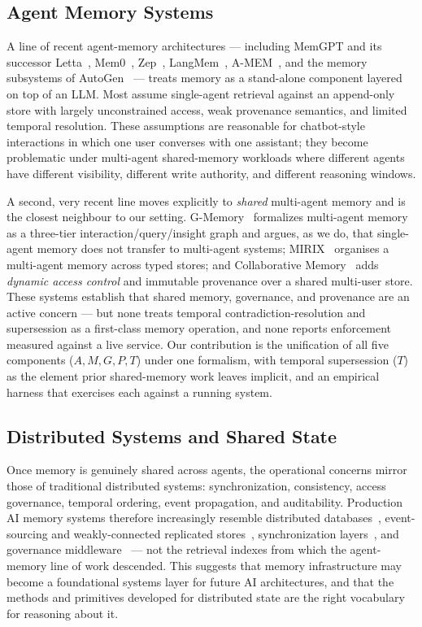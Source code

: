 \documentclass[10pt,twocolumn,letterpaper]{article}
\begin{document}
\subsection{Agent Memory Systems}

A line of recent agent-memory architectures --- including MemGPT and its successor Letta~\citep{memgpt2023}, Mem0~\citep{mem0}, Zep~\citep{zep}, LangMem~\citep{langmem}, A-MEM~\citep{amem2025}, and the memory subsystems of AutoGen~\citep{autogen} --- treats memory as a stand-alone component layered on top of an LLM. Most assume single-agent retrieval against an append-only store with largely unconstrained access, weak provenance semantics, and limited temporal resolution. These assumptions are reasonable for chatbot-style interactions in which one user converses with one assistant; they become problematic under multi-agent shared-memory workloads where different agents have different visibility, different write authority, and different reasoning windows.

A second, very recent line moves explicitly to \emph{shared} multi-agent memory and is the closest neighbour to our setting. G-Memory~\citep{gmemory2025} formalizes multi-agent memory as a three-tier interaction/query/insight graph and argues, as we do, that single-agent memory does not transfer to multi-agent systems; MIRIX~\citep{mirix2025} organises a multi-agent memory across typed stores; and Collaborative Memory~\citep{collabmemory2025} adds \emph{dynamic access control} and immutable provenance over a shared multi-user store. These systems establish that shared memory, governance, and provenance are an active concern --- but none treats temporal contradiction-resolution and supersession as a first-class memory operation, and none reports enforcement measured against a live service. Our contribution is the unification of all five components (\(A, M, G, P, T\)) under one formalism, with temporal supersession (\(T\)) as the element prior shared-memory work leaves implicit, and an empirical harness that exercises each against a running system.

\subsection{Distributed Systems and Shared State}

Once memory is genuinely shared across agents, the operational concerns mirror those of traditional distributed systems: synchronization, consistency, access governance, temporal ordering, event propagation, and auditability. Production AI memory systems therefore increasingly resemble distributed databases~\citep{dynamo2007, spanner2013}, event-sourcing and weakly-connected replicated stores~\citep{bayou1995, crdt2011}, synchronization layers~\citep{lamport1978}, and governance middleware~\citep{rbac1996, nist_attribute_based} --- not the retrieval indexes from which the agent-memory line of work descended. This suggests that memory infrastructure may become a foundational systems layer for future AI architectures, and that the methods and primitives developed for distributed state are the right vocabulary for reasoning about it.
\end{document}
